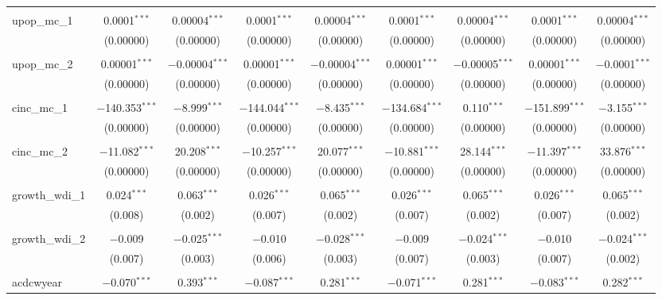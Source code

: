 \begin{table}[!htbp]
\begin{tabular}{@{\extracolsep{5pt}}lcccccccc}
  & & & & & & & & \\ 
 upop\_mc\_1 & 0.0001$^{***}$ & 0.00004$^{***}$ & 0.0001$^{***}$ & 0.00004$^{***}$ & 0.0001$^{***}$ & 0.00004$^{***}$ & 0.0001$^{***}$ & 0.00004$^{***}$ \\ 
  & (0.00000) & (0.00000) & (0.00000) & (0.00000) & (0.00000) & (0.00000) & (0.00000) & (0.00000) \\ 
  & & & & & & & & \\ 
 upop\_mc\_2 & 0.00001$^{***}$ & $-$0.00004$^{***}$ & 0.00001$^{***}$ & $-$0.00004$^{***}$ & 0.00001$^{***}$ & $-$0.00005$^{***}$ & 0.00001$^{***}$ & $-$0.0001$^{***}$ \\ 
  & (0.00000) & (0.00000) & (0.00000) & (0.00000) & (0.00000) & (0.00000) & (0.00000) & (0.00000) \\ 
  & & & & & & & & \\ 
 cinc\_mc\_1 & $-$140.353$^{***}$ & $-$8.999$^{***}$ & $-$144.044$^{***}$ & $-$8.435$^{***}$ & $-$134.684$^{***}$ & 0.110$^{***}$ & $-$151.899$^{***}$ & $-$3.155$^{***}$ \\ 
  & (0.00000) & (0.00000) & (0.00000) & (0.00000) & (0.00000) & (0.00000) & (0.00000) & (0.00000) \\ 
  & & & & & & & & \\ 
 cinc\_mc\_2 & $-$11.082$^{***}$ & 20.208$^{***}$ & $-$10.257$^{***}$ & 20.077$^{***}$ & $-$10.881$^{***}$ & 28.144$^{***}$ & $-$11.397$^{***}$ & 33.876$^{***}$ \\ 
  & (0.00000) & (0.00000) & (0.00000) & (0.00000) & (0.00000) & (0.00000) & (0.00000) & (0.00000) \\ 
  & & & & & & & & \\ 
 growth\_wdi\_1 & 0.024$^{***}$ & 0.063$^{***}$ & 0.026$^{***}$ & 0.065$^{***}$ & 0.026$^{***}$ & 0.065$^{***}$ & 0.026$^{***}$ & 0.065$^{***}$ \\ 
  & (0.008) & (0.002) & (0.007) & (0.002) & (0.007) & (0.002) & (0.007) & (0.002) \\ 
  & & & & & & & & \\ 
 growth\_wdi\_2 & $-$0.009 & $-$0.025$^{***}$ & $-$0.010 & $-$0.028$^{***}$ & $-$0.009 & $-$0.024$^{***}$ & $-$0.010 & $-$0.024$^{***}$ \\ 
  & (0.007) & (0.003) & (0.006) & (0.003) & (0.007) & (0.003) & (0.007) & (0.002) \\ 
  & & & & & & & & \\ 
 acdcwyear & $-$0.070$^{***}$ & 0.393$^{***}$ & $-$0.087$^{***}$ & 0.281$^{***}$ & $-$0.071$^{***}$ & 0.281$^{***}$ & $-$0.083$^{***}$ & 0.282$^{***}$ \\ 

\end{tabular}
\end{table}

